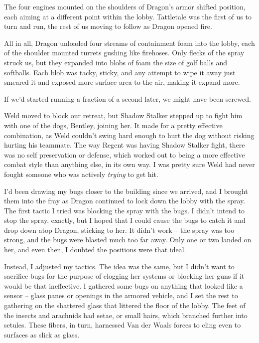 





The four engines mounted on the shoulders of Dragon's armor shifted position, each aiming at a different point within the lobby.  Tattletale was the first of us to turn and run, the rest of us moving to follow as Dragon opened fire.



All in all, Dragon unloaded four streams of containment foam into the lobby, each of the shoulder mounted turrets  gushing like firehoses.  Only flecks of the spray struck us, but they expanded into blobs of foam the size of golf balls and softballs.  Each blob was tacky, sticky, and any attempt to wipe it away just smeared it and exposed more surface area to the air, making it expand more.



If we'd started running a fraction of a second later, we might have been screwed.



Weld moved to block our retreat, but Shadow Stalker stepped up to fight him with one of the dogs, Bentley, joining her.  It made for a pretty effective combination, as Weld couldn't swing hard enough to hurt the dog without risking hurting his teammate.  The way Regent was having Shadow Stalker fight, there was no self preservation or defense, which worked out to being a more effective combat style than anything else, in its own way.  I was pretty sure Weld had never fought someone who was actively \emph{trying} to get hit.



I'd been drawing my bugs closer to the building since we arrived, and I brought them into the fray as Dragon continued to lock down the lobby with the spray.  The first tactic I tried was blocking the spray with the bugs.  I didn't intend to stop the spray, exactly, but I hoped that I could cause the bugs to catch it and drop down atop Dragon, sticking to her.  It didn't work – the spray was too strong, and the bugs were blasted much too far away.  Only one or two landed on her, and even then, I doubted the positions were that ideal.



Instead, I adjusted my tactics.  The idea was the same, but I didn't want to sacrifice bugs for the purpose of clogging her systems or blocking her guns if it would be that ineffective.  I gathered some bugs on anything that looked like a sensor – glass panes or openings in the armored vehicle, and I set the rest to gathering on the shattered glass that littered the floor of the lobby.  The feet of the insects and arachnids had setae, or small hairs, which branched further into setules.  These fibers, in turn, harnessed Van der Waals forces to cling even to surfaces as slick as glass.



